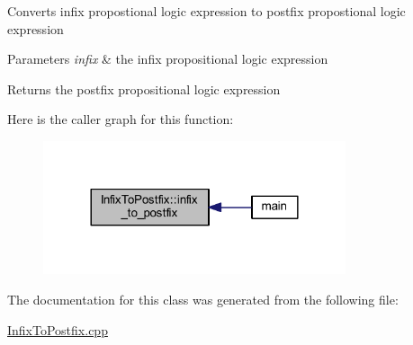 Converts infix propostional logic expression to postfix propostional logic expression ~\newline
 


\begin{DoxyParams}{Parameters}
{\em infix} & the infix propositional logic expression \\
\hline
\end{DoxyParams}
\begin{DoxyReturn}{Returns}
the postfix propositional logic expression 
\end{DoxyReturn}
Here is the caller graph for this function\+:\nopagebreak
\begin{figure}[H]
\begin{center}
\leavevmode
\includegraphics[width=252pt]{class_infix_to_postfix_a7206f78b3bb99dcba5bc4a8eb6fce5ad_icgraph}
\end{center}
\end{figure}


The documentation for this class was generated from the following file\+:\begin{DoxyCompactItemize}
\item 
\mbox{\hyperlink{_infix_to_postfix_8cpp}{Infix\+To\+Postfix.\+cpp}}\end{DoxyCompactItemize}
